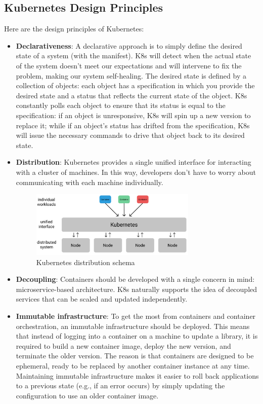 \subsection{Kubernetes Design Principles}

Here are the design principles of Kubernetes:
\begin{itemize}
    \item \textbf{Declarativeness}: A declarative approach is to simply define the desired state of a system (with the manifest). K8s will detect when the actual state of the system doesn't meet our expectations and will intervene to fix the problem, making our system self-healing. The desired state is defined by a collection of objects: each object has a specification in which you provide the desired state and a status that reflects the current state of the object. K8s constantly polls each object to ensure that its status is equal to the specification: if an object is unresponsive, K8s will spin up a new version to replace it; while if an object's status has drifted from the specification, K8s will issue the necessary commands to drive that object back to its desired state.
    \item \textbf{Distribution}: Kubernetes provides a single unified interface for interacting with a cluster of machines. In this way, developers don't have to worry about communicating with each machine individually.
    \begin{figure} [H]
        \centering
        \includegraphics[width=0.75\textwidth]{images/Cloud/K8sDistribution.png}
        \caption{Kubernetes distribution schema}
        \label{fig:K8sDistribution}
    \end{figure}
    \item \textbf{Decoupling}: Containers should be developed with a single concern in mind: microservice-based architecture. K8s naturally supports the idea of decoupled services that can be scaled and updated independently.
    \item \textbf{Immutable infrastructure}: To get the most from containers and container orchestration, an immutable infrastructure should be deployed. This means that instead of logging into a container on a machine to update a library, it is required to build a new container image, deploy the new version, and terminate the older version. The reason is that containers are designed to be ephemeral, ready to be replaced by another container instance at any time. Maintaining immutable infrastructure makes it easier to roll back applications to a previous state (e.g., if an error occurs) by simply updating the configuration to use an older container image.
\end{itemize} 

